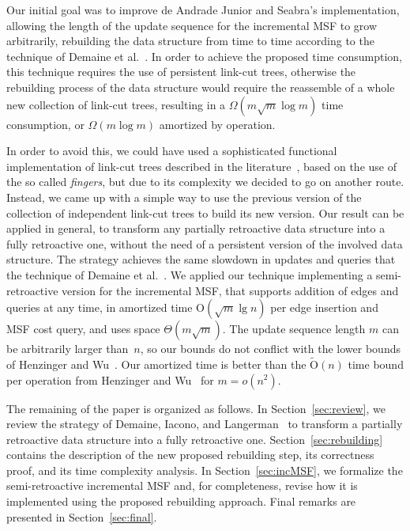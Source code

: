 \documentclass[reqno,11pt]{amsart}
\newcommand{\Oh}{\mathrm{O}}
\begin{document}
Our initial goal was to improve de Andrade Junior and Seabra's implementation,
allowing the length of the update sequence for the incremental MSF to grow arbitrarily,
rebuilding the data structure from time to time according to the technique 
of Demaine et al.~\cite{DemaineIL2007}. In order to achieve the proposed time 
consumption, this technique requires the use of persistent link-cut trees, otherwise 
the rebuilding process of the data structure
would require the reassemble of a whole new collection of link-cut trees, resulting 
in a $\Omega(m \sqrt{m} \log{m})$ time consumption, or $\Omega(m \log{m})$ amortized by operation.

In order to avoid this, we could have used a sophisticated functional implementation of link-cut 
trees described in  the literature~\cite{DemaineLP2008}, based on the use of the so called \emph{fingers},
but due to its complexity we decided to go on another route. Instead, we came up with a simple way to use 
the previous version of the collection of independent link-cut trees to 
build its new version.  Our result can be applied in general, to transform 
any partially retroactive data structure into a fully retroactive one, 
without the need of a persistent version of the involved data structure.  
The strategy achieves the same slowdown in updates and queries that the 
technique of Demaine et al.~\cite{DemaineIL2007}.  We applied our technique 
implementing a semi-retroactive version for the incremental MSF, that supports 
addition of edges and queries at any time, in amortized time $\Oh(\sqrt{m}\lg n)$ 
per edge insertion and MSF cost query, and uses space $\Theta(m\sqrt{m})$.  
The update sequence length $m$ can be arbitrarily larger than~$n$, 
so our bounds do not conflict with the lower bounds of Henzinger and Wu~\cite{HenzingerW2021}. Our amortized time is better than the $\tilde{\Oh}(n)$ time 
bound per operation from Henzinger and Wu~\cite{HenzingerW2021} for $m = o(n^2)$.

The remaining of the paper is organized as follows. 
In Section~\ref{sec:review}, we review the strategy of Demaine, Iacono, and 
Langerman~\cite{DemaineIL2007} to transform a partially retroactive data structure 
into a fully retroactive one.
Section~\ref{sec:rebuilding} contains the description of the new proposed rebuilding step, 
its correctness proof, and its time complexity analysis. 
In Section~\ref{sec:incMSF}, we formalize the semi-retroactive incremental MSF
and, for completeness, revise how it is implemented using the proposed rebuilding approach. 
Final remarks are presented in Section~\ref{sec:final}.
\end{document}
